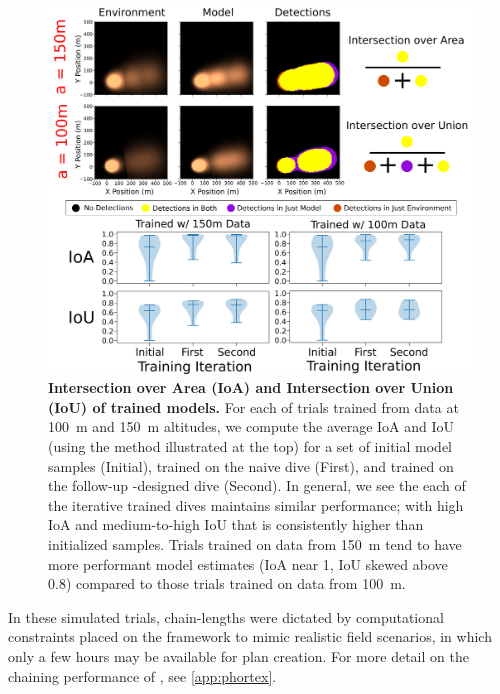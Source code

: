 \begin{figure}[h!]
    \centering
    \includegraphics[width=0.9\columnwidth]{figures/sim_mod_performance.png}
    \caption{\textbf{Intersection over Area (IoA) and Intersection over Union (IoU) of trained models.} For each of trials trained from data at \SI{100}{\meter} and \SI{150}{\meter} altitudes, we compute the average IoA and IoU (using the method illustrated at the top) for a set of initial model samples (Initial), \PHUMES trained on the naive dive (First), and \PHUMES trained on the follow-up \PHORTEX-designed dive (Second). In general, we see the each of the iterative trained dives maintains similar performance; with high IoA and medium-to-high IoU that is consistently higher than initialized samples. Trials trained on data from \SI{150}{\meter} tend to have more performant model estimates (IoA near 1, IoU skewed above 0.8) compared to those trials trained on data from \SI{100}{\meter}.}
    \label{fig:sim_phumes_perform}
\end{figure}

In these simulated trials, chain-lengths were dictated by computational constraints placed on the framework to mimic realistic field scenarios, in which only a few hours may be available for plan creation. For more detail on the chaining performance of \PHUMES, see \cref{app:phortex}.

